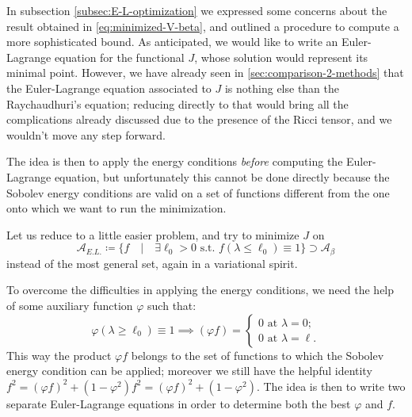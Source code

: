 In subsection \ref{subsec:E-L-optimization} we expressed some concerns about the result obtained in \eqref{eq:minimized-V-beta}, and outlined a procedure to compute a more sophisticated bound.
As anticipated, we would like to write an Euler-Lagrange equation for the functional \(J\), whose solution would represent its minimal point.
However, we have already seen in \ref{sec:comparison-2-methods} that the Euler-Lagrange equation associated to \(J\) is nothing else than the Raychaudhuri's equation; reducing directly to that would bring all the complications already discussed due to the presence of the Ricci tensor, and we wouldn't move any step forward.

The idea is then to apply the energy conditions \emph{before} computing the Euler-Lagrange equation, but unfortunately this cannot be done directly because the Sobolev energy conditions are valid on a set of functions different from the one onto which we want to run the minimization.

Let us reduce to a little easier problem, and try to minimize \(J\) on
\[
\mathcal{A}_{E.L.} \coloneqq \{f \quad \vert \quad \exists \ell_0 > 0 \text{ s.t. } f(\lambda \le \ell_0) \equiv 1\} \supset \mathcal{A}_{\beta}
\]
instead of the most general set, again in a variational spirit.

To overcome the difficulties in applying the energy conditions, we need the help of some auxiliary function \(\varphi\) such that:
\[
\varphi(\lambda \ge \ell_0) \equiv 1 \implies \left(\varphi f\right)   =
\begin{cases}
    0 \text{ at } \lambda = 0;\\
    0 \text{ at } \lambda = \ell.
\end{cases}
\]
This way the product \(\varphi f\) belongs to the set of functions to which the Sobolev energy condition can be applied; moreover we still have the helpful identity \(f^2 = \left(\varphi f\right)^2 + \left(1 - \varphi^2\right) f^2 = \left(\varphi f\right)^2 + \left(1 - \varphi^2\right)\). The idea is then to write two separate Euler-Lagrange equations in order to determine both the best \(\varphi\) and \(f\). 

